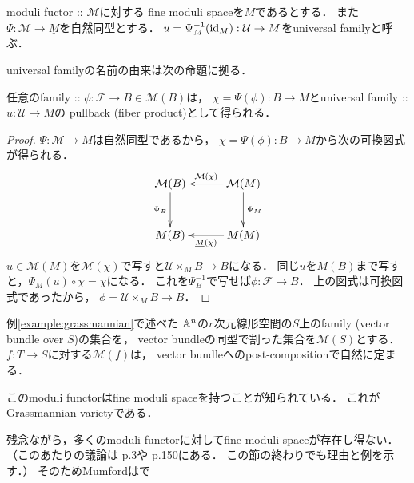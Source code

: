 \documentclass[a4paper]{jsarticle}
\newcommand{\famF}{\mathcal{F}}
\newcommand{\famU}{\mathcal{U}}
\newcommand{\ftor}[1]{\underline{#1}}
\newcommand{\ftorM}{\mathcal{M}}
\begin{document}
    \begin{Def}
        moduli fuctor :: $\ftorM$に対する
        fine moduli spaceを$M$であるとする．
        また$\Psi: \ftorM \to \ftor{M}$を自然同型とする．
        $u=\Psi_M^{-1}(\id[M]): \famU \to M$をuniversal familyと呼ぶ．
    \end{Def}

    universal familyの名前の由来は次の命題に拠る．
    \begin{Prop}\label{prop:univfamily}
        任意のfamily :: $\phi: \famF \to B \in \ftorM(B)$は，
        $\chi=\Psi(\phi): B \to M$とuniversal family :: $u: \famU \to M$の
        pullback (fiber product)として得られる．
    \end{Prop}
    \begin{proof}
        $\Psi: \ftorM \to \ftor{M}$は自然同型であるから，
        $\chi=\Psi(\phi): B \to M$から次の可換図式が得られる．
        \[\xymatrix@=30pt{
                \ftorM(B) \ar[d]_-{\Psi_B}& \ftorM(M) \ar[l]_-{\ftorM(\chi)}\ar[d]^-{\Psi_M}\\
                \ftor{M}(B) & \ar[l]^-{\ftor{M}(\chi)} \ftor{M}(M) \\
        }\]
        $u \in \ftorM(M)$を$\ftorM(\chi)$で写すと$\famU \times_M B \to B$になる．
        同じ$u$を$\ftor{M}(B)$まで写すと，$\Psi_M(u) \circ \chi=\chi$になる．
        これを$\Psi_B^{-1}$で写せば$\phi:\famF \to B$．
        上の図式は可換図式であったから，
        $\phi=\famU \times_M B \to B$．
    \end{proof}

    \begin{Example}
        例\ref{example:grassmannian}で述べた
        $\mathbb{A}^n$の$r$次元線形空間の$S$上のfamily
        (vector bundle over $S$)の集合を，
        vector bundleの同型で割った集合を$\ftorM(S)$とする．
        $f: T \to S$に対する$\ftorM(f)$は，
        vector bundleへのpost-compositionで自然に定まる．

        このmoduli functorはfine moduli spaceを持つことが知られている．
        これがGrassmannian varietyである．
    \end{Example}

    残念ながら，多くのmoduli functorに対してfine moduli spaceが存在し得ない．
    （このあたりの議論は\cite{HaMo} p.3や\cite{HarDef} p.150にある．
    この節の終わりでも理由と例を示す．）
    そのためMumfordは\cite{GIT}で
\end{document}
